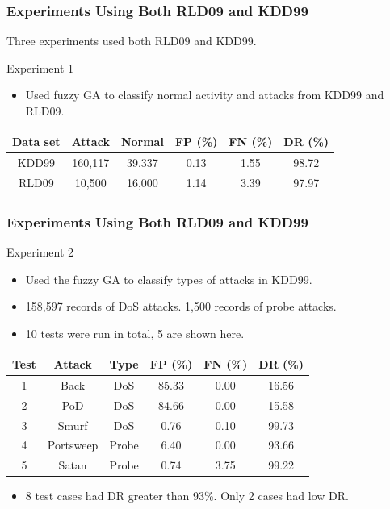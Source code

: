 \documentclass{beamer}
\newcommand{\linespace}{\vskip 0.25cm}
\begin{document}
\begin{frame}
	\frametitle{Experiments Using Both RLD09 and KDD99}
Three experiments used both RLD09 and KDD99.

\linespace
\linespace

Experiment 1
	\begin{itemize}
		\item Used fuzzy GA to classify normal activity and attacks from KDD99 and RLD09.
	\end{itemize}
	
\begin{table}
\begin{tabular}{cccccc}
Data set & Attack & Normal & FP (\%) & FN (\%) & DR (\%)\\ \hline
KDD99 & 160,117 & 39,337 & 0.13 & 1.55 & 98.72\\
RLD09 & 10,500 & 16,000 & 1.14 & 3.39 & 97.97\\
\end{tabular}
\end{table}
\end{frame}


\begin{frame}
	\frametitle{Experiments Using Both RLD09 and KDD99}
Experiment 2
	\begin{itemize}
		\item Used the fuzzy GA to classify types of attacks in KDD99.
		\item 158,597 records of DoS attacks. 1,500 records of probe attacks.
		\item 10 tests were run in total, 5 are shown here.
	\end{itemize}
\begin{table}
\begin{tabular}{cccccc}
Test & Attack & Type & FP (\%) & FN (\%) & DR (\%)\\ \hline
1 & Back & DoS & 85.33 & 0.00 & 16.56\\
2 & PoD & DoS & 84.66 & 0.00 & 15.58\\
3 & Smurf & DoS & 0.76 & 0.10 & 99.73\\
4 & Portsweep & Probe & 6.40 & 0.00 & 93.66\\
5 & Satan & Probe & 0.74 & 3.75 & 99.22\\
\end{tabular}
\end{table}

\begin{itemize}
	\item 8 test cases had DR greater than 93\%. Only 2 cases had low DR.
\end{itemize}

\end{frame}
\end{document}
